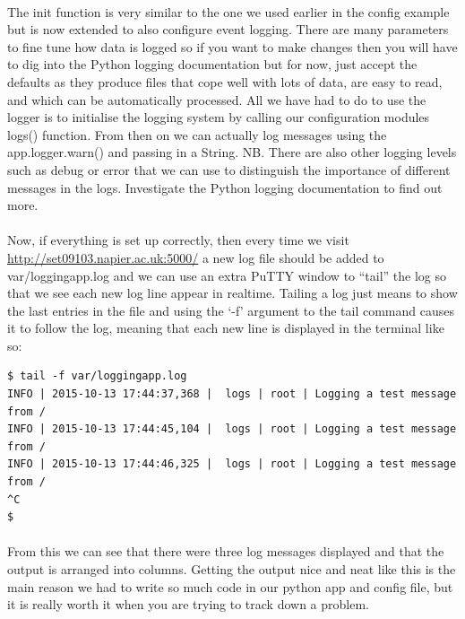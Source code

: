 \documentclass[12pt, a4paper, oneside]{book}
\begin{document}
\paragraph{} The init function is very similar to the one we used earlier in the config example but is now extended to also configure event logging. There are many parameters to fine tune how data is logged so if you want to make changes then you will have to dig into the Python logging documentation but for now, just accept the defaults as they produce files that cope well with lots of data, are easy to read, and which can be automatically processed. All we have had to do to use the logger is to initialise the logging system by calling our configuration modules logs() function. From then on we can actually log messages using the app.logger.warn() and passing in a String. NB. There are also other logging levels such as debug or error that we can use to distinguish the importance of different messages in the logs. Investigate the Python logging documentation to find out more. 

\paragraph{} Now, if everything is set up correctly, then every time we visit \url{http://set09103.napier.ac.uk:5000/} a new log file should be added to var/loggingapp.log and we can use an extra PuTTY window to ``tail'' the log so that we see each new log line appear in realtime. Tailing a log just means to show the last entries in the file and using the `-f' argument to the tail command causes it to follow the log, meaning that each new line is displayed in the terminal like so:

\begin{lstlisting}[style=DOS]
$ tail -f var/loggingapp.log 
INFO | 2015-10-13 17:44:37,368 |  logs | root | Logging a test message from /
INFO | 2015-10-13 17:44:45,104 |  logs | root | Logging a test message from /
INFO | 2015-10-13 17:44:46,325 |  logs | root | Logging a test message from /
^C
$ 
\end{lstlisting}

\paragraph{} From this we can see that there were three log messages displayed and that the output is arranged into columns. Getting the output nice and neat like this is the main reason we had to write so much code in our python app and config file, but it is really worth it when you are trying to track down a problem.
\end{document}
